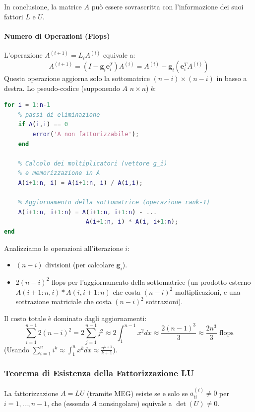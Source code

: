 In conclusione, la matrice $A$ può essere sovrascritta con l'informazione dei suoi fattori $L$ e $U$.
\paragraph{Numero di Operazioni (Flops)}
L'operazione $A^{(i+1)} = L_i A^{(i)}$ equivale a:
$$ A^{(i+1)} = (I - \mathbf{g}_i \mathbf{e}_i^T) A^{(i)} = A^{(i)} - \mathbf{g}_i (\mathbf{e}_i^T A^{(i)}) $$
Questa operazione aggiorna solo la sottomatrice $(n-i) \times (n-i)$ in basso a destra.
Lo pseudo-codice (supponendo $A$ $n \times n$) è:

\begin{lstlisting}[language=matlab]
% Algoritmo di Fattorizzazione LU (sovrascrive A)
for i = 1:n-1
    % passi di eliminazione
    if A(i,i) == 0
        error('A non fattorizzabile'); 
    end
    
    % Calcolo dei moltiplicatori (vettore g_i)
    % e memorizzazione in A
    A(i+1:n, i) = A(i+1:n, i) / A(i,i);
    
    % Aggiornamento della sottomatrice (operazione rank-1)
    A(i+1:n, i+1:n) = A(i+1:n, i+1:n) - ...
                       A(i+1:n, i) * A(i, i+1:n);
end
\end{lstlisting}

Analizziamo le operazioni all'iterazione $i$:
\begin{itemize}
    \item $(n-i)$ divisioni (per calcolare $\mathbf{g}_i$).
    \item $2(n-i)^2$ flops per l'aggiornamento della sottomatrice (un prodotto esterno $A(i+1:n, i) * A(i, i+1:n)$ che costa $(n-i)^2$ moltiplicazioni, e una sottrazione matriciale che costa $(n-i)^2$ sottrazioni).
\end{itemize}
Il costo totale è dominato dagli aggiornamenti:
$$ \sum_{i=1}^{n-1} 2(n-i)^2 = 2 \sum_{j=1}^{n-1} j^2 \approx 2 \int_1^{n-1} x^2 dx \approx \frac{2(n-1)^3}{3} \approx \frac{2n^3}{3} \text{ flops} $$
(Usando $\sum_{i=1}^{n} i^k \approx \int_1^n x^k dx \approx \frac{n^{k+1}}{k+1}$).

\subsubsection{Teorema di Esistenza della Fattorizzazione LU}
La fattorizzazione $A=LU$ (tramite MEG) esiste se e solo se $a_{ii}^{(i)} \neq 0$ per $i=1, \dots, n-1$, che (essendo $A$ nonsingolare) equivale a $\det(U) \neq 0$.

